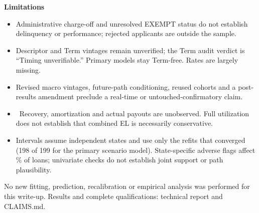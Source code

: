 \colorbox{blue!6}{\parbox{.965\linewidth}{\textbf{Limitations}\begin{itemize}\setlength\itemsep{2pt}
\item Administrative charge-off and unresolved EXEMPT status do not establish delinquency or performance; rejected applicants are outside the sample.
\item Descriptor and Term vintages remain unverified; the Term audit verdict is ``Timing unverifiable.'' Primary models stay Term-free. Rates are largely missing.
\item Revised macro vintages, future-path conditioning, reused cohorts and a post-results amendment preclude a real-time or untouched-confirmatory claim.
\item \losslabel\ Recovery, amortization and actual payouts are unobserved. Full utilization does not establish that combined EL is necessarily conservative.
\item Intervals assume independent states and use only the refits that converged (198 of 199 for the primary scenario model). State-specific adverse flags affect \SupportShare\% of loans; univariate checks do not establish joint support or path plausibility.
\end{itemize}}}

\small No new fitting, prediction, recalibration or empirical analysis was performed for this write-up. Results and complete qualifications: technical report and CLAIMS.md.

